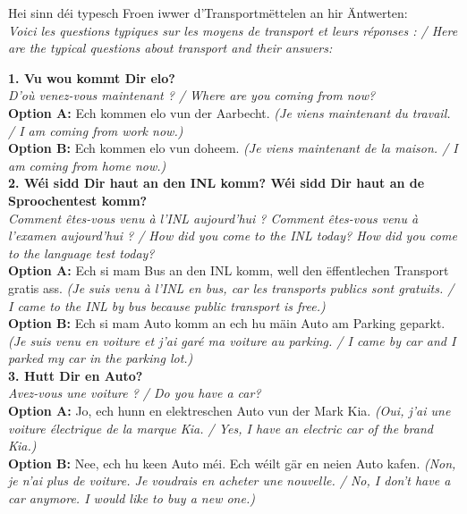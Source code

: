 Hei sinn déi typesch Froen iwwer d'Transportmëttelen an hir Äntwerten: \\
\textit{Voici les questions typiques sur les moyens de transport et leurs réponses : / Here are the typical questions about transport and their answers:}

\vspace{1em}

\noindent\textbf{1. Vu wou kommt Dir elo?}\\
\textit{D'où venez-vous maintenant ? / Where are you coming from now?}\\
\textbf{Option A:} Ech kommen elo vun der Aarbecht. \textit{(Je viens maintenant du travail. / I am coming from work now.)}\\
\textbf{Option B:} Ech kommen elo vun doheem. \textit{(Je viens maintenant de la maison. / I am coming from home now.)}\\[1em]

\noindent\textbf{2. Wéi sidd Dir haut an den INL komm? Wéi sidd Dir haut an de Sproochentest komm?}\\
\textit{Comment êtes-vous venu à l'INL aujourd'hui ? Comment êtes-vous venu à l'examen aujourd'hui ? / How did you come to the INL today? How did you come to the language test today?}\\
\textbf{Option A:} Ech si mam Bus an den INL komm, well den ëffentlechen Transport gratis ass. \textit{(Je suis venu à l'INL en bus, car les transports publics sont gratuits. / I came to the INL by bus because public transport is free.)}\\
\textbf{Option B:} Ech si mam Auto komm an ech hu mäin Auto am Parking geparkt. \textit{(Je suis venu en voiture et j'ai garé ma voiture au parking. / I came by car and I parked my car in the parking lot.)}\\[1em]

\noindent\textbf{3. Hutt Dir en Auto?}\\
\textit{Avez-vous une voiture ? / Do you have a car?}\\
\textbf{Option A:} Jo, ech hunn en elektreschen Auto vun der Mark Kia. \textit{(Oui, j'ai une voiture électrique de la marque Kia. / Yes, I have an electric car of the brand Kia.)}\\
\textbf{Option B:} Nee, ech hu keen Auto méi. Ech wéilt gär en neien Auto kafen. \textit{(Non, je n'ai plus de voiture. Je voudrais en acheter une nouvelle. / No, I don't have a car anymore. I would like to buy a new one.)}\\[1em]

